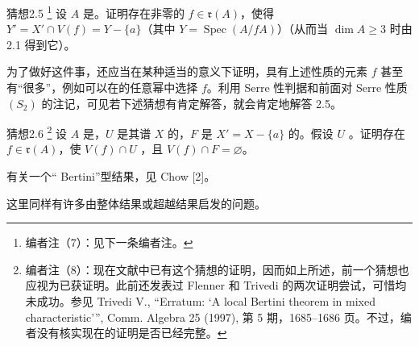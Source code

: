 \begin{SGAresult}{猜想}{2.5}
\footnote{编者注（7）：见下一条编者注。}
设 $A$ 是。证明存在非零的 $f\in\mathfrak r(A)$，使得 $Y'=X'\cap V(f)=Y-\{a\}$（其中 $Y=\operatorname{Spec}(A/fA)$）（从而当 $\dim A\geq3$ 时由 2.1 得到它）。
\end{SGAresult}
为了做好这件事，还应当在某种适当的意义下证明，具有上述性质的元素 $f$ 甚至有“很多”，例如可以在的任意幂中选择 $f$。利用 Serre 性判据和前面对 Serre 性质 $(S_2)$ 的注记，可见若下述猜想有肯定解答，就会肯定地解答 2.5。

\begin{SGAresult}{猜想}{2.6}
\footnote{编者注（8）：现在文献中已有这个猜想的证明，因而如上所述，前一个猜想也应视为已获证明。此前还发表过 Flenner 和 Trivedi 的两次证明尝试，可惜均未成功。参见 Trivedi V., “Erratum: ‘A local Bertini theorem in mixed characteristic’”, Comm. Algebra 25 (1997), 第 5 期，1685--1686 页。不过，编者没有核实现在的证明是否已经完整。}
设 $A$ 是，$U$ 是其谱 $X$ 的，$F$ 是 $X'=X-\{a\}$ 的。假设 $U$ 。证明存在 $f\in\mathfrak r(A)$，使 $V(f)\cap U$ ，且 $V(f)\cap F=\varnothing$。
\end{SGAresult}
有关一个“ Bertini”型结果，见 Chow [2]。

这里同样有许多由整体结果或超越结果启发的问题。

